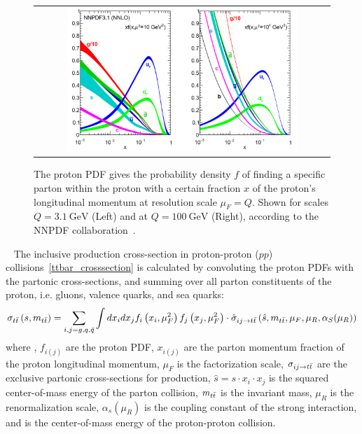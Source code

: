 \begin{figure}[!h]
  \begin{center}
    \begin{tabular}{c}
        \includegraphics[width=0.80\textwidth]{fig_TopQuark/Parton_Distribution_Functions.png}
    \end{tabular}
    \caption{The proton PDF gives the probability density $f$ of finding a specific parton within the proton with a certain fraction $x$ of the proton's longitudinal momentum at resolution scale $\mu_F = Q$.
    Shown for scales $Q = \SI{3.1}{\GeV}$ (Left) and at $Q = \SI{100}{\GeV}$ (Right), according to the NNPDF collaboration~\cite{Ball:2267455}.
            }
    \label{Parton_Distribution_Functions}
  \end{center}
\end{figure}
~\cite{Ball:2267455}
The inclusive \ttbar production cross-section in proton-proton ($pp$) collisions~\ref{ttbar_crosssection} is calculated by convoluting the proton PDFs with the partonic cross-sections, and summing over all parton constituents of the proton, i.e. gluons, valence quarks, and sea quarks:
\begin{align}
\sigma_{t\bar{t}}\left(s, m_{t\bar{t}}\right)=\sum_{i, j=g, q, \bar{q}} \int d x_i d x_j f_i\left(x_i, \mu_F^2\right) f_j\left(x_j, \mu_F^2\right) \cdot \hat{\sigma}_{i j \rightarrow t\bar{t}}\left(\hat{s}, m_{t\bar{t}}, \mu_F, \mu_R, \alpha_S(\mu_R)\right)
\label{ttbar_crosssection}
\end{align}
where , $f_{i(j)}$ are the proton PDF, $x_{i(j)}$ are the parton momentum fraction of the proton longitudinal momentum, $\mu_F$ is the factorization scale, $\sigma_{i j \rightarrow t\bar{t}}$ are the exclusive partonic cross-sections for \ttbar production, $\hat{s} = s \cdot x_i \cdot x_j$ is the squared center-of-mass energy of the parton collision, $m_{t\bar{t}}$ is the \ttbar invariant mass, $\mu_R$ is the renormalization scale, $\alpha_s(\mu_R)$ is the coupling constant of the strong interaction, and \beamenergy is the center-of-mass energy of the proton-proton collision.
